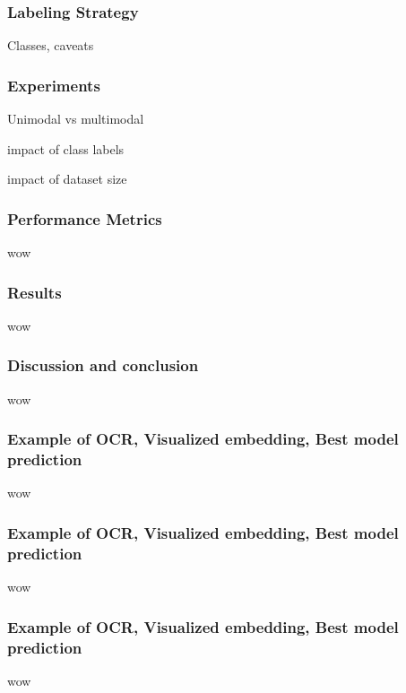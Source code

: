 \documentclass[aspectratio=1610]{beamer}
\begin{document}
\normalpage

\begin{frame}
  \frametitle{Labeling Strategy}
Classes, caveats
\end{frame}
\normalpage


\begin{frame}
  \frametitle{Experiments}
Unimodal vs multimodal

impact of class labels

impact of dataset size

\end{frame}
\normalpage


\begin{frame}
  \frametitle{Performance Metrics}
wow
\end{frame}
\normalpage


\begin{frame}
  \frametitle{Results}
wow
\end{frame}
\normalpage

\begin{frame}
  \frametitle{Discussion and conclusion}
wow
\end{frame}
\normalpage

\begin{frame}
  \frametitle{Example of OCR, Visualized embedding, Best model prediction}
wow
\end{frame}
\normalpage

\begin{frame}
  \frametitle{Example of OCR, Visualized embedding, Best model prediction}
wow
\end{frame}
\normalpage

\begin{frame}
  \frametitle{Example of OCR, Visualized embedding, Best model prediction}
wow
\end{frame}
\normalpage
\end{document}
